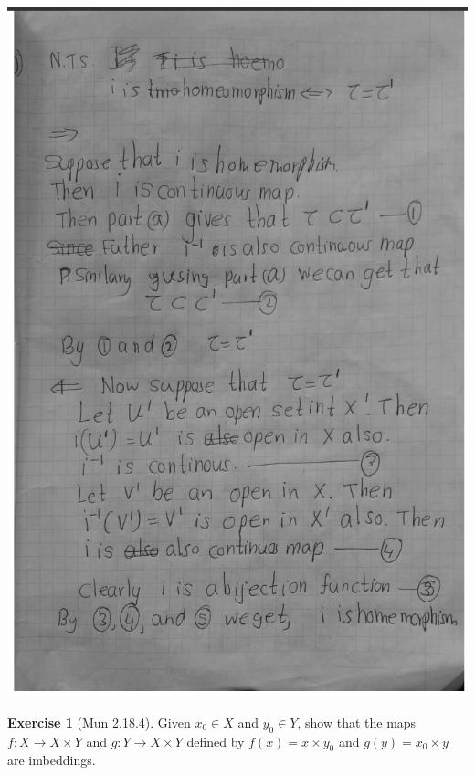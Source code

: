 \documentclass[
]{book}
\theoremstyle{definition}
\theoremstyle{definition}
\theoremstyle{definition}
\newtheorem{exercise}{Exercise}[chapter]
\theoremstyle{definition}
\theoremstyle{remark}
\begin{document}
\includegraphics{figures/Exercises/Ex 2.18/ex-3-2.png}

\begin{exercise}[Mun 2.18.4]
\protect\hypertarget{exr:unnamed-chunk-192}{}\label{exr:unnamed-chunk-192}Given \(x_0 \in X\) and \(y_0 \in Y\), show that the maps \(f : X \rightarrow X \times Y\) and \(g : Y \rightarrow X \times Y\) defined by
\(f(x) = x \times y_0\) and \(g(y) = x_0 \times y\)
are imbeddings.
\end{exercise}
\end{document}
